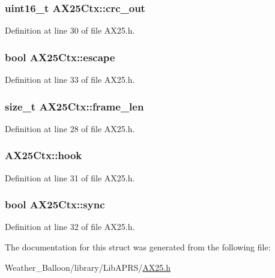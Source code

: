 \subsubsection[{\texorpdfstring{crc\+\_\+out}{crc\_out}}]{\setlength{\rightskip}{0pt plus 5cm}uint16\+\_\+t A\+X25\+Ctx\+::crc\+\_\+out}\hypertarget{struct_a_x25_ctx_aea6a6b921e34e3ed514e4598a907adf1}{}\label{struct_a_x25_ctx_aea6a6b921e34e3ed514e4598a907adf1}


Definition at line 30 of file A\+X25.\+h.

\subsubsection[{\texorpdfstring{escape}{escape}}]{\setlength{\rightskip}{0pt plus 5cm}bool A\+X25\+Ctx\+::escape}\hypertarget{struct_a_x25_ctx_a2cf354b3ec66e851815667cf1ac43c06}{}\label{struct_a_x25_ctx_a2cf354b3ec66e851815667cf1ac43c06}


Definition at line 33 of file A\+X25.\+h.

\subsubsection[{\texorpdfstring{frame\+\_\+len}{frame\_len}}]{\setlength{\rightskip}{0pt plus 5cm}size\+\_\+t A\+X25\+Ctx\+::frame\+\_\+len}\hypertarget{struct_a_x25_ctx_a4863474d8ded80b51d5cc1c2aff9f840}{}\label{struct_a_x25_ctx_a4863474d8ded80b51d5cc1c2aff9f840}


Definition at line 28 of file A\+X25.\+h.

\subsubsection[{\texorpdfstring{hook}{hook}}]{ A\+X25\+Ctx\+::hook}\hypertarget{struct_a_x25_ctx_aaf4149ca8e0ac15cb846f57b5a2056cd}{}\label{struct_a_x25_ctx_aaf4149ca8e0ac15cb846f57b5a2056cd}


Definition at line 31 of file A\+X25.\+h.

\subsubsection[{\texorpdfstring{sync}{sync}}]{\setlength{\rightskip}{0pt plus 5cm}bool A\+X25\+Ctx\+::sync}\hypertarget{struct_a_x25_ctx_a9ff9110cc05e86005aaab19c41aa3237}{}\label{struct_a_x25_ctx_a9ff9110cc05e86005aaab19c41aa3237}


Definition at line 32 of file A\+X25.\+h.



The documentation for this struct was generated from the following file\+:\begin{DoxyCompactItemize}
\item 
Weather\+\_\+\+Balloon/library/\+Lib\+A\+P\+R\+S/\hyperlink{_a_x25_8h}{A\+X25.\+h}\end{DoxyCompactItemize}

